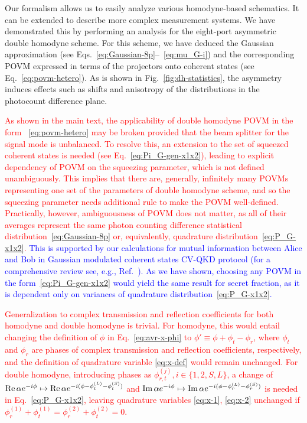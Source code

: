 \documentclass[%
reprint,
superscriptaddress,
 amsmath,amssymb,amsfonts,
 aps,
 pra,
 longbibliography
]{revtex4-2}
\renewcommand{\Re}{\mathop{\rm Re}\nolimits}
\renewcommand{\Im}{\mathop{\rm Im}\nolimits}
\begin{document}
Our formalism allows us to easily analyze various homodyne-based schematics. It can be
extended to describe more complex measurement systems.
We have demonstrated this by performing an analysis for
the eight-port asymmetric  double homodyne scheme.
For this scheme,
we have deduced the Gaussian approximation
(see Eqs.~\eqref{eq:Gaussian-8p}--~\eqref{eq:mu_G-i})
and the corresponding POVM expressed in terms of the
projectors onto coherent states (see Eq.~\eqref{eq:povm-hetero}).
As is shown in Fig.~\ref{fig:dh-statistics},
the asymmetry induces effects such as shifts and
anisotropy of the distributions in the photocount difference plane. 


\textcolor{red}{As shown in the main text, the applicability of double homodyne POVM in the form ~\eqref{eq:povm-hetero} may be broken provided that the beam splitter for the signal mode is unbalanced. To resolve this, an extension to the set of squeezed coherent states is needed (see Eq.~\eqref{eq:Pi_G-gen-x1x2}), leading to explicit dependency of POVM on the squeezing parameter, which is not defined unambiguously. This implies that there are, generally, infinitely many POVMs representing one set of the parameters of double homodyne scheme, and so the squeezing parameter needs additional rule to make the POVM well-defined. Practically, however, ambiguousness of POVM does not matter, as  all of their averages represent the same photon counting difference statistical distribution~\eqref{eq:Gaussian-8p} or, equivalently, quadrature distribution~\eqref{eq:P_G-x1x2}.} \textcolor{blue}{This is supported by our calculations for mutual information between Alice and Bob in Gaussian modulated coherent states CV-QKD protocol (for a comprehensive review see, e.g., Ref.~\cite{laudenbach2018continuous}). As we have shown, choosing any POVM in the form~\eqref{eq:Pi_G-gen-x1x2} would yield the same result for secret fraction, as it is dependent only on variances of quadrature distribution~\eqref{eq:P_G-x1x2}.}

\textcolor{red}{Generalization to complex transmission and reflection
  coefficients for both homodyne and double homodyne is trivial. For
  homodyne, this would entail changing the definition of $\phi$ in
  Eq.{~\eqref{eq:avr-x-phi}} to $\phi'\equiv\phi+\phi_t-\phi_r$, where
  $\phi_t$ and $\phi_r$ are phases of complex transmission and
  reflection coefficients, respectively, and the definition of
  quadrature variable {\eqref{eq:x-def}} would remain unchanged. For
  double homodyne, introducing phases as $\phi_{r,t}^{(j)},
  i\in\{1,2,S,L\}$, a change of $\Re\alpha
  e^{-i\phi}\mapsto\Re\alpha
  e^{-i(\phi-\phi_t^{(L)}-\phi_t^{(S)})}$ and $\Im\alpha
  e^{-i\phi}\mapsto\Im\alpha
  e^{-i(\phi-\phi_r^{(L)}-\phi_r^{(S)})}$ is needed in
  Eq.{~\eqref{eq:P_G-x1x2}}, leaving quadrature variables
  {\eqref{eq:x-1}}, {\eqref{eq:x-2}} unchanged if
  $\phi_r^{(1)}+\phi_t^{(1)}=\phi_r^{(2)}+\phi_t^{(2)}=0$.} 
\end{document}
